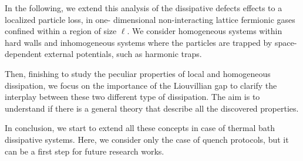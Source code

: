 In the following, we extend this analysis of the dissipative defects effects to a localized particle loss, in one-
dimensional non-interacting lattice fermionic gases confined within a region of size $\ell$. We consider
homogeneous systems within hard walls and inhomogeneous systems where the particles are trapped
by space-dependent external potentials, such as harmonic traps.

Then, finishing to study the peculiar properties of local and homogeneous dissipation, we focus on the importance
of the Liouvillian gap to clarify the interplay between these two different type of dissipation. The aim is
to understand if there is a general theory that describe all the discovered properties.

In conclusion, we start to extend all these concepts in case of thermal bath dissipative systems. Here, we 
consider only the case of quench protocols, but it can be a first step for future research works. 










